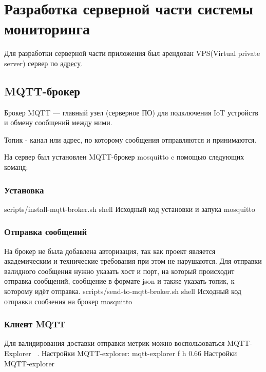 \documentclass{bmstu}
\begin{document}
    \section{Разработка серверной части системы мониторинга}
    Для разработки серверной части приложения был арендован VPS(Virtual private server) сервер по \href{http://vm4481772.25ssd.had.wf:3000/d/ce3f4anwhavpce/plant-monitoring?from=now-15m&to=now&timezone=browser}{адресу}.

    \subsection{MQTT-брокер}
    Брокер MQTT — главный узел (серверное ПО) для подключения IoT устройств и обмену сообщений между ними.

    Топик - канал или адрес, по которому сообщения отправляются и принимаются.

    На сервер был установлен MQTT-брокер mosquitto \cite{ndunguInstallMosquittoMQTT}  c помощью следующих команд:

    \subsubsection{Установка}
        {scripts/install-mqtt-broker.sh} %
        {shell}
        {Исходный код установки и запука mosquitto} %

    \subsubsection{Отправка сообщений}
    На брокер не была добавлена авторизация, так как проект является академическим и технические требования при этом не нарушаются.
    Для отправки валидного сообщения нужно указать хост и порт, на который происходит отправка сообщений,
    сообщение в формате json и также указать топик, к которому идёт отправка.
        {scripts/send-to-mqtt-broker.sh} %
        {shell}
        {Исходный код отправки сообзения на брокер mosquitto} %
    
    \subsubsection{Клиент MQTT}
    Для валидирования доставки отправки метрик можно воспользоваться MQTT-Explorer ~\cite{nordquistMQTTExplorer}.
    Настройки MQTT-explorer:
        {mqtt-explorer} %
        {f} %
        {h} %
        {0.66\textwidth} %
        {Настройки MQTT-explorer} %
\end{document}
